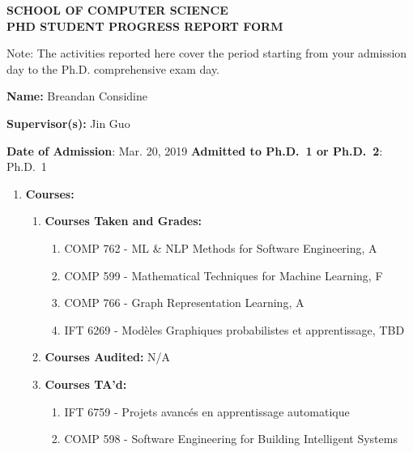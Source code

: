 \documentclass[11pt]{article}
\begin{document}
    \begin{center}
        \large {\bf SCHOOL OF COMPUTER SCIENCE \\ PHD STUDENT PROGRESS REPORT FORM}
    \end{center}

    Note: The activities reported here cover the period starting
    from your admission day to the Ph.D. comprehensive exam day.
    \medskip

    \textbf{Name:} Breandan Considine

    \textbf{Supervisor(s):} Jin Guo

    \textbf{Date of Admission}: Mar. 20, 2019
    \hspace{45mm}
    \textbf{Admitted to Ph.D.\ 1 or Ph.D.\ 2}: Ph.D.\ 1

    \begin{enumerate}
        \item \textbf{Courses:}
        \begin{enumerate}
            \item \textbf{Courses Taken and Grades:}

            \begin{enumerate}
                \item COMP 762 - ML \& NLP Methods for Software Engineering, A
                \item COMP 599 - Mathematical Techniques for Machine Learning, F
                \item COMP 766 - Graph Representation Learning, A
                \item IFT 6269 - Mod\`eles Graphiques probabilistes et apprentissage, TBD
            \end{enumerate}

            \item \textbf{Courses Audited:} N/A

            \item \textbf{Courses TA'd:}

            \begin{enumerate}
                \item IFT 6759 - Projets avanc\'es en apprentissage automatique
                \item COMP 598 - Software Engineering for Building Intelligent Systems
            \end{enumerate}


\end{enumerate}
\end{enumerate}
\end{document}

